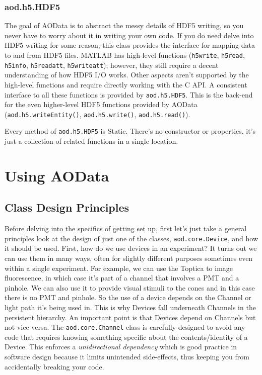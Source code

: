 \documentclass[10pt]{exam}
\newcommand\aodclass[1]{\textcolor{codeblue}{\texttt{#1}}}
\newcommand\aodfcn[1]{\textcolor{darkteal}{\texttt{#1}}}
\newcommand\matfcn[1]{\textcolor{darkteal}{\texttt{#1}}}
\begin{document}
	\subsubsection{aod.h5.HDF5}
		\noindent The goal of AOData is to abstract the messy details of HDF5 writing, so you never have to worry about it in writing your own code. If you do need delve into HDF5 writing for some reason, this class provides the interface for mapping data to and from HDF5 files. MATLAB has high-level functions (\matfcn{h5write}, \matfcn{h5read}, \matfcn{h5info}, \matfcn{h5readatt}, \matfcn{h5writeatt}); however, they still require a decent understanding of how HDF5 I/O works. Other aspects aren't supported by the high-level functions and require directly working with the C API. A consistent interface to all these functions is provided by \aodclass{aod.h5.HDF5}. This is the back-end for the even higher-level HDF5 functions provided by AOData (\aodfcn{aod.h5.writeEntity()}, \aodfcn{aod.h5.write()}, \aodfcn{aod.h5.read()}).
		
		Every method of \aodclass{aod.h5.HDF5} is Static. There's no constructor or properties, it's just a collection of related functions in a single location. 
	 
\section{Using AOData}
	\subsection{Class Design Principles}\label{subsection:ClassDesign}
		\noindent Before delving into the specifics of getting set up, first let's just take a general principles look at the design of just one of the classes, \aodclass{aod.core.Device}, and how it should be used. 
		First, how do we use devices in an experiment? It turns out we can use them in many ways, often for slightly different purposes sometimes even within a single experiment. For example, we can use the Toptica to image fluorescence, in which case it's part of a channel that involves a PMT and a pinhole. We can also use it to provide visual stimuli to the cones and in this case there is no PMT and pinhole. So the use of a device depends on the Channel or light path it's being used in. This is why Devices fall underneath Channels in the persistent hierarchy. An important point is that Devices depend on Channels but not vice versa. The \aodclass{aod.core.Channel} class is carefully designed to avoid any code that requires knowing something specific about the contents/identity of a Device. This enforces a \textit{unidirectional dependency} which is good practice in software design because it limits unintended side-effects, thus keeping you from accidentally breaking your code. 
		
\end{document}
